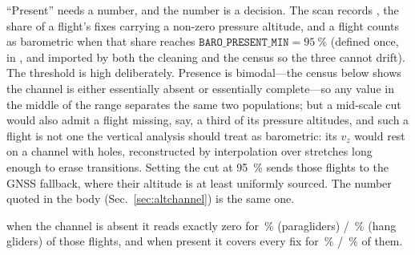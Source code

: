 \begin{revblock}
\enquote{Present} needs a number, and the number is a decision. The scan records
, the share of a flight's fixes carrying a non-zero pressure
altitude, and a flight counts as barometric when that share reaches
$\mathtt{BARO\_PRESENT\_MIN}=\SI{95}{\percent}$ (defined once, in
, and imported by both the cleaning and the census
so the three cannot drift). The threshold is high deliberately. Presence is bimodal---the
census below shows the channel is either essentially absent or essentially complete---so
any value in the middle of the range separates the same two populations; but a
mid-scale cut would also admit a flight missing, say, a third of its pressure altitudes,
and such a flight is not one the vertical analysis should treat as barometric: its
$v_z$ would rest on a channel with holes, reconstructed by interpolation over stretches
long enough to erase transitions. Setting the cut at \SI{95}{\percent} sends those
flights to the GNSS fallback, where their altitude is at least uniformly sourced. The
number quoted in the body (Sec.~\ref{sec:altchannel}) is the same one.
\end{revblock}

 when the channel is absent it reads exactly zero for
\StatScanParaBaroZeroPct\,\% (paragliders) / \StatScanHangBaroZeroPct\,\% (hang gliders) of
those flights, and when present it covers every fix for \StatScanParaBaroFullPct\,\% /
\StatScanHangBaroFullPct\,\% of them.


